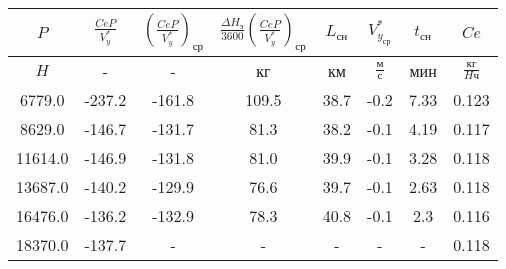 \begin{tabular}{|c|c|c|c|c|c|c|c|}
\hline
$P$ & $\frac{CeP}{V_y^*}$ & $(\frac{CeP}{V_y^*})_{ср}$ & $\frac{\Delta H_э}{3600}(\frac{CeP}{V_y^*})_{ср}$ & $L_{сн}$ & $V_{y_{ср}}^*$ & $t_{сн}$ & $Ce$ \\ 
\hline
$H$ & - & - & кг & км & $\frac{м}{с}$ & мин & $\frac{кг}{H ч}$ \\ 
\hline
6779.0 & -237.2 & -161.8 & 109.5 & 38.7 & -0.2 & 7.33 & 0.123 \\ 
\hline
8629.0 & -146.7 & -131.7 & 81.3 & 38.2 & -0.1 & 4.19 & 0.117 \\ 
\hline
11614.0 & -146.9 & -131.8 & 81.0 & 39.9 & -0.1 & 3.28 & 0.118 \\ 
\hline
13687.0 & -140.2 & -129.9 & 76.6 & 39.7 & -0.1 & 2.63 & 0.118 \\ 
\hline
16476.0 & -136.2 & -132.9 & 78.3 & 40.8 & -0.1 & 2.3 & 0.116 \\ 
\hline
18370.0 & -137.7 & - & - & - & - & - & 0.118 \\ 
\hline
\end{tabular}